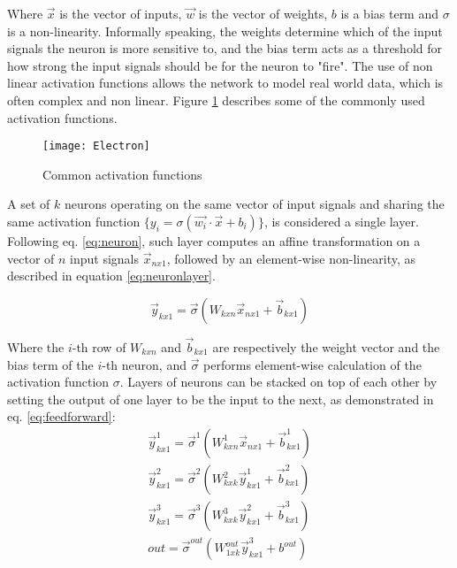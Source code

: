 Where \(\vec{x}\) is the vector of inputs, \(\vec{w}\) is the vector of weights, \(b\) is a bias term and \(\sigma\) is a non-linearity. Informally speaking, the weights determine which of the input signals the neuron is more sensitive to, and the bias term acts as a threshold for how strong the input signals should be for the neuron to "fire". The use of non linear activation functions allows the network to model real world data, which is often complex and non linear. Figure \ref{fig:activations} describes some of the commonly used activation functions.

\begin{figure}
  \centering
    \texttt{[image: Electron]}
  \caption{Common activation functions}
  \label{fig:activations}
\end{figure}

A set of \(k\) neurons operating on the same vector of input signals and sharing the same activation function \(\{y_i = \sigma(\vec{w_i}\cdot\vec{x} + b_i)\}\), is considered a single layer. Following eq. \ref{eq:neuron}, such layer computes an affine transformation on a vector of \(n\) input signals  \(\vec{x}_{nx1}\), followed by an element-wise non-linearity, as described in equation \ref{eq:neuronlayer}. 

\begin{equation}
    \vec{y}_{kx1} = \vec{\sigma}({W_{kxn}\vec{x}_{nx1}} + \vec{b}_{kx1})
    \label{eq:neuronlayer}
\end{equation}

Where the \(i\)-th row of \(W_{kxn}\) and \(\vec{b}_{kx1}\) are respectively the weight vector and the bias term of the \(i\)-th neuron, and \(\vec{\sigma}\) performs element-wise calculation of the activation function \(\sigma\). Layers of neurons can be stacked on top of each other by setting the output of one layer to be the input to the next, as demonstrated in eq. \ref{eq:feedforward}:
\begin{equation}
    \begin{split}
    \vec{y}^1_{kx1} = \vec{\sigma}^1({W^1_{kxn}\vec{x}_{nx1}} + \vec{b}^1_{kx1}) \\
    \vec{y}^2_{kx1} = \vec{\sigma}^2({W^2_{kxk}\vec{y}^1_{kx1}} + \vec{b}^2_{kx1}) \\
    \vec{y}^3_{kx1} = \vec{\sigma}^3({W^3_{kxk}\vec{y}^2_{kx1}} + \vec{b}^3_{kx1}) \\
    out = \vec{\sigma}^{out}({W^{out}_{1xk}\vec{y}^3_{kx1}} + b^{out})
    \end{split}
    \label{eq:feedforward}
\end{equation}

